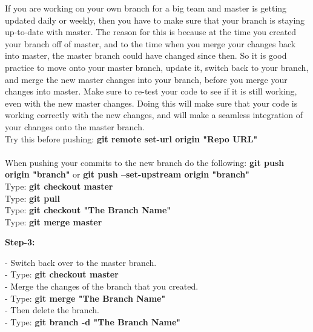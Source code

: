 \documentclass[11pt, a4papper]{article}
\begin{document}
\begin{adjustwidth}{3cm}{} 
If you are working on your own branch for a big team and master is getting updated daily or weekly, then you have to make sure that your branch is staying up-to-date with master. The reason for this is because at the time you created your branch off of master, and to the time when you merge your changes back into master, the master branch could have changed since then. So it is good  practice to move onto your master branch, update it, switch back to your branch, and merge the new master changes into your branch, before you merge your changes into master. Make sure to re-test your code to see if it is still working, even with the new master changes. Doing this will make sure that your code is working correctly with the new changes, and will make a seamless integration of your changes onto the master branch. \\

\pagebreak
\noindent Try this before pushing: \textbf{git remote set-url origin "Repo URL"} \\ \\
When pushing your commits to the new branch do the following: \textbf{git push origin "branch"} or \textbf{git push --set-upstream origin "branch"} \\

\noindent Type: \textbf{git checkout master} \\
Type: \textbf{git pull} \\
Type: \textbf{git checkout "The Branch Name"} \\
Type: \textbf{git merge master} \\

\end{adjustwidth}
\indent \indent \textbf{Step-3:} \\
\begin{adjustwidth}{3cm}{} 
- Switch back over to the master branch. \\
\indent - Type: \textbf{git checkout master} \\
- Merge the changes of the branch that you created. \\
\indent - Type: \textbf{git merge "The Branch Name"} \\
- Then delete the branch. \\
\indent - Type: \textbf{git branch -d "The Branch Name"} \\
\end{adjustwidth}
\end{document}
